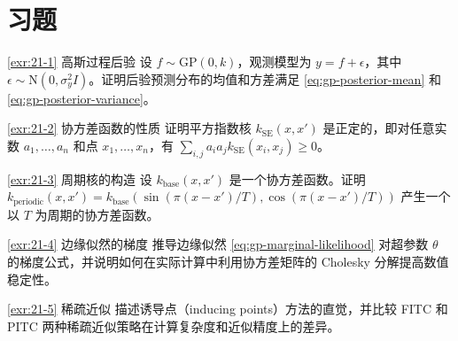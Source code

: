 \section{习题}\label{sec:chapter21-exercises}

\begin{Exercise}{\ref{exr:21-1} 高斯过程后验}\label{exr:21-1}
设 $f \sim \mathrm{GP}(0, k)$，观测模型为 $y = f + \epsilon$，其中 $\epsilon \sim \mathrm{N}(0, \sigma_y^2 I)$。证明后验预测分布的均值和方差满足 \cref{eq:gp-posterior-mean} 和 \cref{eq:gp-posterior-variance}。
\end{Exercise}

\begin{Exercise}{\ref{exr:21-2} 协方差函数的性质}\label{exr:21-2}
证明平方指数核 $k_{\mathrm{SE}}(x, x')$ 是正定的，即对任意实数 $a_1, \ldots, a_n$ 和点 $x_1, \ldots, x_n$，有 $\sum_{i,j} a_i a_j k_{\mathrm{SE}}(x_i, x_j) \geq 0$。
\end{Exercise}

\begin{Exercise}{\ref{exr:21-3} 周期核的构造}\label{exr:21-3}
设 $k_{\mathrm{base}}(x, x')$ 是一个协方差函数。证明 $k_{\mathrm{periodic}}(x, x') = k_{\mathrm{base}}(\sin(\pi (x - x') / T), \cos(\pi (x - x') / T))$ 产生一个以 $T$ 为周期的协方差函数。
\end{Exercise}

\begin{Exercise}{\ref{exr:21-4} 边缘似然的梯度}\label{exr:21-4}
推导边缘似然 \cref{eq:gp-marginal-likelihood} 对超参数 $\theta$ 的梯度公式，并说明如何在实际计算中利用协方差矩阵的 Cholesky 分解提高数值稳定性。
\end{Exercise}

\begin{Exercise}{\ref{exr:21-5} 稀疏近似}\label{exr:21-5}
描述诱导点（inducing points）方法的直觉，并比较 FITC 和 PITC 两种稀疏近似策略在计算复杂度和近似精度上的差异。
\end{Exercise}

\endinput
